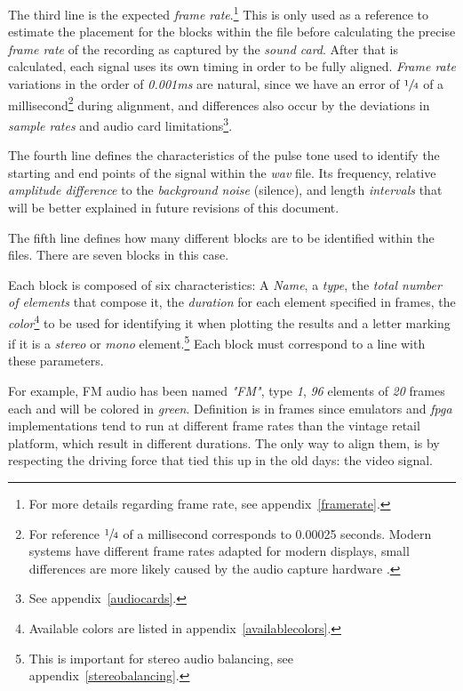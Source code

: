 \documentclass[10pt,a4paper]{report}
\newcommand{\ac}[1]{\textit{\mbox{\acrshort{#1}}}}
\begin{document}
\begin{appendices}
The third line is the expected \textit{frame rate}.\footnote{For more details regarding frame rate, see appendix~\ref{framerate}.} This is only used as a reference to estimate the placement for the blocks within the file before calculating the precise \textit{frame rate} of the recording as captured by the \textit{sound card}. After that is calculated, each signal uses its own timing in order to be fully aligned. \textit{Frame rate} variations in the order of \textit{0.001}\ac{ms} are natural, since we have an error of $\sfrac{1}{4}$ of a millisecond\footnote{For reference $\sfrac{1}{4}$ of a millisecond corresponds to 0.00025 seconds. Modern systems have different frame rates adapted for modern displays, small differences are more likely caused by the audio capture hardware \cite{SoundCardClock}.} during alignment, and differences also occur by the deviations in \textit{sample rates} and audio card limitations\footnote{See appendix~\ref{audiocards}.}.

The fourth line defines the characteristics of the pulse tone used to identify the starting and end points of the signal within the \ac{wav} file. Its frequency, relative \textit{amplitude difference} to the \textit{background noise} (silence), and length \textit{intervals} that will be better explained in future revisions of this document.

The fifth line defines how many different blocks are to be identified within the files. There are seven blocks in this case.

Each block is composed of six characteristics: A \textit{Name}, a \textit{type}, the \textit{total number of elements} that compose it, the \textit{duration} for each element specified in frames, the \textit{color}\footnote{Available colors are listed in appendix~\ref{availablecolors}.} to be used for identifying it when plotting the results and a letter marking if it is a \textit{stereo} or \textit{mono} element.\footnote{This is important for stereo audio balancing, see appendix~\ref{stereobalancing}.} Each block must correspond to a line with these parameters.

For example, FM audio has been named \textit{"FM"}, type \textit{1}, \textit{96} elements of \textit{20} frames each and will be colored in \textit{green}. Definition is in frames since emulators and \ac{fpga} implementations tend to run at different frame rates than the vintage retail platform, which result in different durations. The only way to align them, is by respecting the driving force that tied this up in the old days: the video signal.


\end{appendices}
\end{document}
